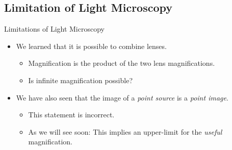 \subsection{Limitation of Light Microscopy}%
\label{sub:limitation_of_light_microscopy}



\begin{frame}{Limitations of Light Microscopy}
	\begin{itemize}
		\item<1-> We learned that it is possible to combine lenses.
		      \begin{itemize}
			      \item<2-> Magnification is the product of the two lens magnifications.
			      \item<3-> Is infinite magnification possible?
		      \end{itemize}
		\item<4-> We have also seen that the image of a \textit{point source} is a \textit{point image}.
		      \begin{itemize}
			      \item<5-> This statement is incorrect.
			      \item<6-> As we will see soon: This implies an upper-limit for the \textit{useful} magnification.
		      \end{itemize}
	\end{itemize}
\end{frame}
